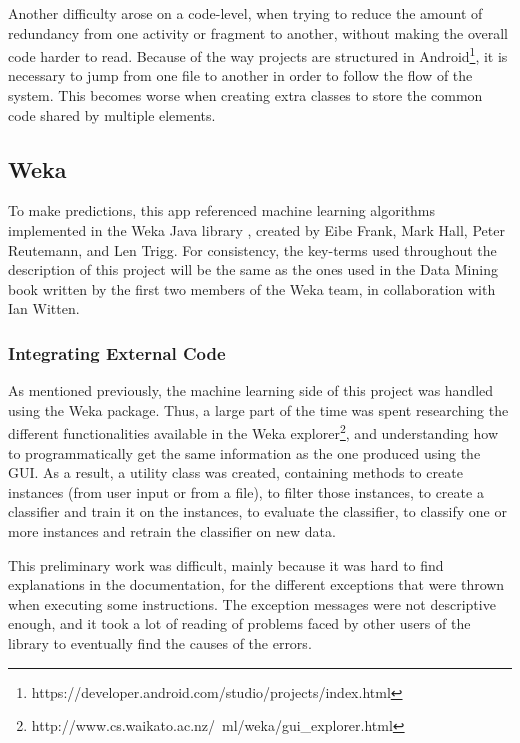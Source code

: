 \documentclass{mproj}
\begin{document}
Another difficulty arose on a code-level, when trying to reduce the amount of redundancy from one activity or fragment to another, without making the overall code harder to read. Because of the way projects are structured in Android\footnote{https://developer.android.com/studio/projects/index.html}, it is necessary to jump from one file to another in order to follow the flow of the system. This becomes worse when creating extra classes to store the common code shared by multiple elements.

\subsection{Weka}

To make predictions, this app referenced machine learning algorithms implemented in the Weka Java library \cite{weka}, created by Eibe Frank, Mark Hall, Peter Reutemann, and Len Trigg. For consistency, the key-terms used throughout the description of this project will be the same as the ones used in the Data Mining book \cite{wekabook} written by the first two members of the Weka team, in collaboration with Ian Witten. \par 

\subsubsection*{Integrating External Code}

As mentioned previously, the machine learning side of this project was handled using the Weka package. Thus, a large part of the time was spent researching the different functionalities available in the Weka explorer\footnote{http://www.cs.waikato.ac.nz/~ml/weka/gui\_explorer.html}, and understanding how to programmatically get the same information as the one produced using the GUI. As a result, a utility class was created, containing methods to create instances (from user input or from a file), to filter those instances, to create a classifier and train it on the instances, to evaluate the classifier, to classify one or more instances and retrain the classifier on new data. \par

This preliminary work was difficult, mainly because it was hard to find explanations in the documentation, for the different exceptions that were thrown when executing some instructions. The exception messages were not descriptive enough, and it took a lot of reading of problems faced by other users of the library to eventually find the causes of the errors. \par
\end{document}
